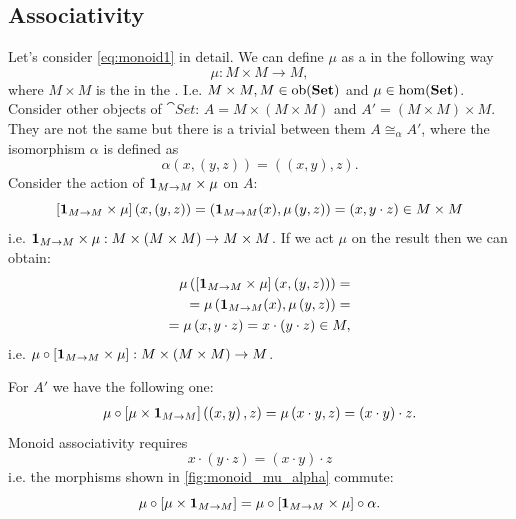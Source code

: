 \subsection{Associativity}
Let's consider \eqref{eq:monoid1} in detail.
We can define $\mu$ as a
 in the following way 
\[
\mu: M\times M \to M,
\]
where $M \times M$ is the  in the
. I.e. $M \times M, M \in \mathrm{ob}(\mathbf{Set})$ and
$\mu \in \mathrm{hom}(\mathbf{Set})$.  Consider other objects of $\cat{Set}$: $A =
M \times \left( M \times M \right)$ and $A' = \left( M \times M \right)
\times M$. They are not the same but there is a trivial
 between them $A \cong_\alpha A'$, where
the isomorphism $\alpha$ is defined as
\[
\alpha(x,(y,z)) = ((x,y),z).
\]
Consider the action of  
$\mathbf{1}_{ M \to M } \times \mu$ on $A$:
\[
\left[\mathbf{1}_{ M \to M } \times \mu \right]\left(x,\left(y,z\right)\right) = 
\left(\mathbf{1}_{ M \to M }(x),\mu\left(y,z\right)\right) = 
\left(x, y \cdot z\right) \in M \times M
\]
i.e. $\mathbf{1}_{ M \to M } \times \mu: M \times \left( M \times M \right) \to M
\times M$. If we act $\mu$ on the result then we can obtain:
\begin{eqnarray}
\mu \left(\left[\mathbf{1}_{ M \to M } \times \mu
  \right]\left(x,\left(y,z\right)\right)\right) = 
\nonumber \\
=
\mu \left(\mathbf{1}_{ M \to M }(x),\mu\left(y,z\right)\right) = 
\nonumber \\
=
\mu\left(x, y \cdot z\right) = x \cdot (y\cdot z) \in M,
\nonumber
\end{eqnarray}
i.e. 
$\mu \circ \left[\mathbf{1}_{ M \to M } \times \mu\right]: M \times \left( M \times M
\right) \to M$.

For $A'$ we have the following one:
\begin{eqnarray}
\mu\circ\left[\mu \times \mathbf{1}_{ M \to M }\right]\left(\left(x,y\right),z\right)
= \mu\left(x \cdot y, z\right) = (x \cdot y) \cdot z.
\nonumber
\end{eqnarray}
Monoid associativity requires 
\[
x \cdot (y\cdot z) = 
(x \cdot y) \cdot z
\]
i.e. the morphisms shown in \cref{fig:monoid_mu_alpha} commute:
\begin{equation}
\label{eq:monad_monoid_mu}
\mu\circ\left[\mu \times \mathbf{1}_{ M \to M }\right] =
\mu \circ \left[\mathbf{1}_{ M \to M } \times \mu\right] \circ \alpha.
\end{equation}

